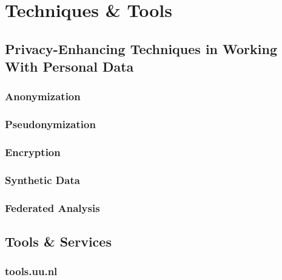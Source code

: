 \documentclass[
]{book}
\begin{document}
\hypertarget{part-techniques-tools}{%
\part*{Techniques \& Tools}\label{part-techniques-tools}}

\hypertarget{privacy-enchancing-techniques}{%
\chapter{Privacy-Enhancing Techniques in Working With Personal Data}\label{privacy-enchancing-techniques}}

\hypertarget{anonymization}{%
\section{Anonymization}\label{anonymization}}

\hypertarget{pseudonymization}{%
\section{Pseudonymization}\label{pseudonymization}}

\hypertarget{encryption}{%
\section{Encryption}\label{encryption}}

\hypertarget{synthetic-data}{%
\section{Synthetic Data}\label{synthetic-data}}

\hypertarget{federated-analysis}{%
\section{Federated Analysis}\label{federated-analysis}}

\hypertarget{tools-and-services}{%
\chapter{Tools \& Services}\label{tools-and-services}}

\hypertarget{tools.uu.nl}{%
\section{tools.uu.nl}\label{tools.uu.nl}}
\end{document}

